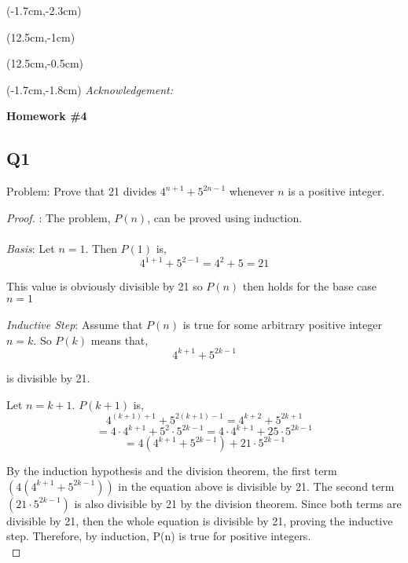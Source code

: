 \documentclass[12pt, oneside]{article}
\begin{document}
\begin{textblock*}{4cm}(-1.7cm,-2.3cm)
\end{textblock*}

\begin{textblock*}{8cm}(12.5cm,-1cm)
\end{textblock*}
\begin{textblock*}{3cm}(12.5cm,-0.5cm)
\end{textblock*}
\begin{textblock*}{13.5cm}(-1.7cm,-1.8cm)
\noindent \textit{\footnotesize Acknowledgement: } 
\end{textblock*}

\vspace{1cm}

\begin{center}
\textbf{\Large Homework \#4}
\end{center}


\subsection*{Q1}
Problem: Prove that 21 divides $4^{n+1} + 5^{2n-1}$ whenever $n$ is a positive integer.

\begin{proof}:
The problem, $P(n)$, can be proved using induction.\\\\
\textit{Basis}: Let $n=1$. Then $P(1)$ is,
\[4^{1+1} + 5^{2-1} = 4^{2} + 5 = 21\]

 This value is obviously divisible by 21 so $P(n)$ then holds for the base case $n=1$\\\\
\textit{Inductive Step}: Assume that $P(n)$ is true for some arbitrary positive integer $n=k$. So $P(k)$ means that,
\[4^{k+1} + 5^{2k-1}\]

is divisible by 21.

Let $n = k+1$. $P(k+1)$ is,
\[4^{(k+1)+1} + 5^{2(k+1)-1} = 4^{k+2} + 5^{2k+1}\]
\[= 4\cdot4^{k+1} + 5^{2}\cdot5^{2k-1} = 4\cdot4^{k+1} + 25\cdot5^{2k-1}\]
\[= 4(4^{k+1} + 5^{2k-1}) + 21\cdot5^{2k-1} \]

By the induction hypothesis and the division theorem, the first term $(4(4^{k+1} + 5^{2k-1}))$ in the equation above is divisible by 21. The second term $(21\cdot5^{2k-1})$ is also divisible by 21 by the division theorem. Since both terms are divisible by 21, then the whole equation is divisible by 21, proving the inductive step. Therefore, by induction, P(n) is true for positive integers.\\
\end{proof}
\end{document}
